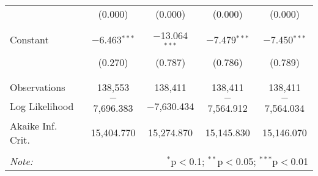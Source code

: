 \begin{table}[!htbp]
\begin{tabular}{@{\extracolsep{-5pt}}lcccc}
  & (0.000) & (0.000) & (0.000) & (0.000) \\ 
  & & & & \\ 
 Constant & $-$6.463$^{***}$ & $-$13.064$^{***}$ & $-$7.479$^{***}$ & $-$7.450$^{***}$ \\ 
  & (0.270) & (0.787) & (0.786) & (0.789) \\ 
  & & & & \\ 
\hline \\[-1.8ex] 
Observations & 138,553 & 138,411 & 138,411 & 138,411 \\ 
Log Likelihood & $-$7,696.383 & $-$7,630.434 & $-$7,564.912 & $-$7,564.034 \\ 
Akaike Inf. Crit. & 15,404.770 & 15,274.870 & 15,145.830 & 15,146.070 \\ 
\hline 
\hline \\[-1.8ex] 
\textit{Note:}  & \multicolumn{4}{r}{$^{*}$p$<$0.1; $^{**}$p$<$0.05; $^{***}$p$<$0.01} \\ 
\end{tabular} 
\end{table} 
